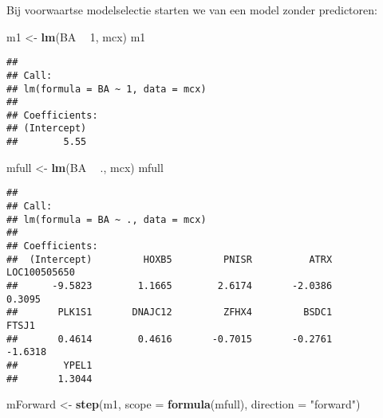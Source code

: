 \documentclass[12pt,dutch,coursenotes]{book}
\newenvironment{Shaded}{\begin{snugshade}}{\end{snugshade}}
\newcommand{\KeywordTok}[1]{\textcolor[rgb]{0.13,0.29,0.53}{\textbf{#1}}}
\newcommand{\DataTypeTok}[1]{\textcolor[rgb]{0.13,0.29,0.53}{#1}}
\newcommand{\DecValTok}[1]{\textcolor[rgb]{0.00,0.00,0.81}{#1}}
\newcommand{\StringTok}[1]{\textcolor[rgb]{0.31,0.60,0.02}{#1}}
\newcommand{\OperatorTok}[1]{\textcolor[rgb]{0.81,0.36,0.00}{\textbf{#1}}}
\newcommand{\NormalTok}[1]{#1}
\theoremstyle{definition}
\theoremstyle{definition}
\theoremstyle{definition}
\theoremstyle{remark}
\begin{document}
Bij voorwaartse modelselectie starten we van een model zonder
predictoren:

\begin{Shaded}
\begin{Highlighting}[]
\NormalTok{m1 <-}\StringTok{ }\KeywordTok{lm}\NormalTok{(BA }\OperatorTok{~}\StringTok{ }\DecValTok{1}\NormalTok{, mcx)}
\NormalTok{m1}
\end{Highlighting}
\end{Shaded}

\begin{verbatim}
## 
## Call:
## lm(formula = BA ~ 1, data = mcx)
## 
## Coefficients:
## (Intercept)  
##        5.55
\end{verbatim}

\begin{Shaded}
\begin{Highlighting}[]
\NormalTok{mfull <-}\StringTok{ }\KeywordTok{lm}\NormalTok{(BA }\OperatorTok{~}\StringTok{ }\NormalTok{., mcx)}
\NormalTok{mfull}
\end{Highlighting}
\end{Shaded}

\begin{verbatim}
## 
## Call:
## lm(formula = BA ~ ., data = mcx)
## 
## Coefficients:
##  (Intercept)         HOXB5         PNISR          ATRX  LOC100505650  
##      -9.5823        1.1665        2.6174       -2.0386        0.3095  
##       PLK1S1       DNAJC12         ZFHX4         BSDC1         FTSJ1  
##       0.4614        0.4616       -0.7015       -0.2761       -1.6318  
##        YPEL1  
##       1.3044
\end{verbatim}

\begin{Shaded}
\begin{Highlighting}[]
\NormalTok{mForward <-}\StringTok{ }\KeywordTok{step}\NormalTok{(m1, }\DataTypeTok{scope =} \KeywordTok{formula}\NormalTok{(mfull), }\DataTypeTok{direction =} \StringTok{"forward"}\NormalTok{)}
\end{Highlighting}
\end{Shaded}
\end{document}
